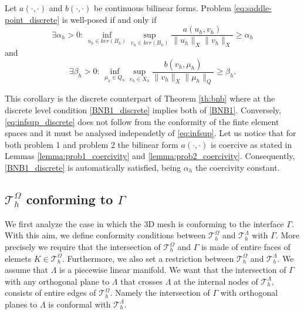 \begin{corollary}{\cite[Theorem 2.42]{MR2050138}}Let $a(\cdot, \cdot)$ and $b(\cdot, \cdot)$ be continuous bilinear forms. 
Problem \eqref{eq:saddle-point_discrete} is well-posed if and only if 
\begin{equation}\label{BNB1_discrete}
\exists \alpha_h >0 :\, \inf_{u_h\in ker(B_h)}\sup_{v_h\in ker(B_h)} \frac{a(u_h,v_h)}{\|u_h\|_{X}\|v_h\|_{X}}\geq \alpha_h
\end{equation}
and 
\begin{equation}\label{eq:infsup_discrete}
\exists \beta_h >0:\,\inf_{\mu_h\in Q_h}\sup_{v_h\in X_h} \frac{b(v_h,\mu_h)}{\|v_h\|_{X}\|\mu_h\|_{Q}}\geq \beta_h .
\end{equation}
\end{corollary}
This corollary is the discrete counterpart of Theorem \ref{th:bnb} where at the discrete level condition \eqref{BNB1_discrete} implies both of \eqref{BNB1}. Conversely, \eqref{eq:infsup_discrete} does not follow from the conformity of the finte element spaces and it must be analysed independetly of \eqref{eq:infsup}.  
Let us notice that for both problem 1 and problem 2 the bilinear form $a(\cdot, \cdot)$ is coercive as stated in Lemmas \eqref{lemma:prob1_coercivity} and \eqref{lemma:prob2_coercivity}. Consequently, \eqref{BNB1_discrete} is automatically satisfied, being $\alpha_h$ the coercivity constant.\\

\subsection{$\mathcal{T}^{\Omega}_h$ conforming to $\Gamma$}
 We first analyze the case in which the 3D mesh is conforming to the interface $\Gamma$. With this aim, we define conformity conditions between $\mathcal{T}^{\Omega}_h$ and $\mathcal{T}^{\Lambda}_h$ with $\Gamma$. More precisely we require that the intersection of $\mathcal{T}^{\Omega}_h$ and $\Gamma$ is made of entire faces of elemets $K \in \mathcal{T}^{\Omega}_h$. Furthermore, we also set a restriction between $\mathcal{T}^{\Omega}_h$ and $\mathcal{T}^{\Lambda}_h$. We assume that $\Lambda$ is a piecewise linear manifold. We want that the intersection of $\Gamma$ with any orthogonal plane to $\Lambda$ that crosses $\Lambda$ at the internal nodes of $\mathcal{T}^{\Lambda}_h$, consists of entire edges of $\mathcal{T}^{\Omega}_h$. Namely the intersection of $\Gamma$ with orthogonal planes to $\Lambda$ is conformal with $\mathcal{T}^{\Lambda}_h$.
